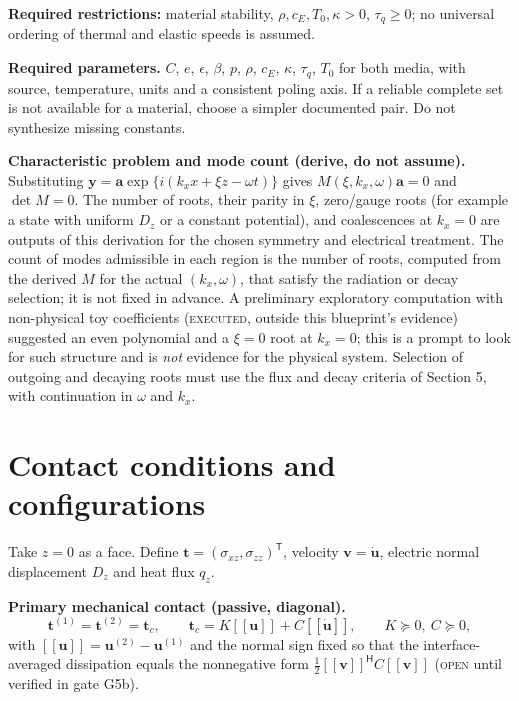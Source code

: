 \documentclass[11pt]{article}
\newcommand{\jj}{[\![}
\newcommand{\kk}{]\!]}
\begin{document}
\textbf{Required restrictions:} material stability, $\rho, c_E, T_0, \kappa>0$,
$\tau_q\ge0$; no universal ordering of thermal and elastic speeds is assumed.

\textbf{Required parameters.} $C$, $e$, $\epsilon$, $\beta$, $p$, $\rho$, $c_E$,
$\kappa$, $\tau_q$, $T_0$ for both media, with source, temperature, units and a
consistent poling axis. If a reliable complete set is not available for a
material, choose a simpler documented pair. Do not synthesize missing constants.

\textbf{Characteristic problem and mode count (derive, do not assume).}
Substituting $\bm{y}=\bm{a}\exp\{i(k_x x + \xi z - \omega t)\}$ gives
$M(\xi,k_x,\omega)\bm{a}=0$ and $\det M=0$. The number of roots, their parity in
$\xi$, zero/gauge roots (for example a state with uniform $D_z$ or a constant
potential), and coalescences at $k_x=0$ are outputs of this derivation for the
chosen symmetry and electrical treatment. The count of modes admissible in each
region is the number of roots, computed from the derived $M$ for the actual
$(k_x,\omega)$, that satisfy the radiation or decay selection; it is not fixed in
advance. A preliminary exploratory computation with non-physical toy coefficients
(\textsc{executed}, outside this blueprint's evidence) suggested an even
polynomial and a $\xi=0$ root at $k_x=0$; this is a prompt to look for such
structure and is \emph{not} evidence for the physical system. Selection of
outgoing and decaying roots must use the flux and decay criteria of Section 5,
with continuation in $\omega$ and $k_x$.

\section{Contact conditions and configurations}

Take $z=0$ as a face. Define $\bm{t}=(\sigma_{xz},\sigma_{zz})^{\mathsf T}$,
velocity $\bm{v}=\dot{\bm{u}}$, electric normal displacement $D_z$ and heat flux
$q_z$.

\textbf{Primary mechanical contact (passive, diagonal).}
\begin{equation}
  \bm{t}^{(1)} = \bm{t}^{(2)} = \bm{t}_c, \qquad
  \bm{t}_c = K\jj\bm{u}\kk + C\jj\dot{\bm{u}}\kk, \qquad
  K\succeq0,\ C\succeq0, \tag{6}
\end{equation}
with $\jj\bm{u}\kk = \bm{u}^{(2)}-\bm{u}^{(1)}$ and the normal sign fixed so that
the interface-averaged dissipation equals the nonnegative form
$\tfrac12\jj\bm{v}\kk^{\mathsf H}C\jj\bm{v}\kk$ (\textsc{open} until verified in
gate G5b).
\end{document}
